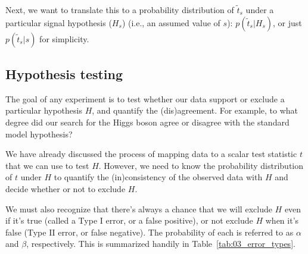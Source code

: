 Next, we want to translate this to a probability distribution of $\tilde{t}_s$ under a particular signal hypothesis ($H_s$) (i.e., an assumed value of $s$): $p(\tilde{t}_s|H_s)$, or just $p(\tilde{t}_s|s)$ for simplicity.


\subsection{Hypothesis testing}
\label{sec:03_hypothesis_testing}

The goal of any experiment is to test whether our data support or exclude a particular hypothesis $H$, and quantify the (dis)agreement. For example, to what degree did our search for the Higgs boson agree or disagree with the standard model hypothesis? 

We have already discussed the process of mapping data to a scalar test statistic $t$ that we can use to test $H$. 
However, we need to know the probability distribution of $t$ under $H$ to quantify the (in)consistency of the observed data with $H$ and decide whether or not to exclude $H$.

We must also recognize that there's always a chance that we will exclude $H$ even if it's true (called a Type I error, or a false positive), or not exclude $H$ when it's false (Type II error, or false negative). 
The probability of each is referred to as $\alpha$ and $\beta$, respectively. 
This is summarized handily in Table~\ref{tab:03_error_types}.


